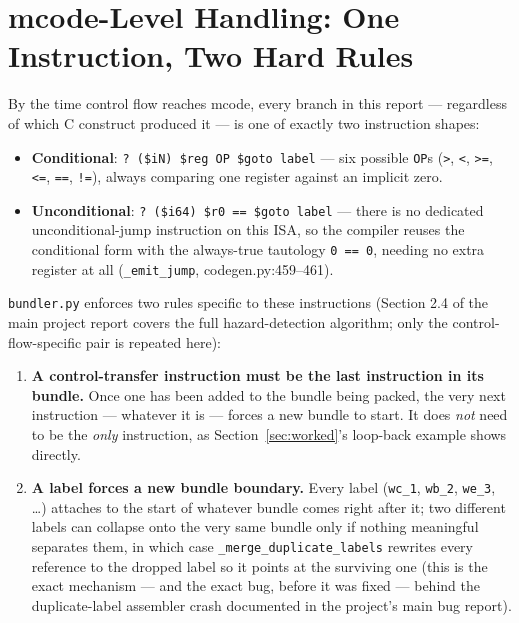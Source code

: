 \documentclass[11pt,a4paper]{article}
\begin{document}
\section{mcode-Level Handling: One Instruction, Two Hard Rules}
\label{sec:mcode}

By the time control flow reaches mcode, every branch in this report --- regardless of
which C construct produced it --- is one of exactly two instruction shapes:
\begin{itemize}
  \item \textbf{Conditional}: \texttt{? (\$iN) \$reg OP \$goto label} --- six possible
        \texttt{OP}s (\texttt{>}, \texttt{<}, \texttt{>=}, \texttt{<=}, \texttt{==}, \texttt{!=}),
        always comparing one register against an implicit zero.
  \item \textbf{Unconditional}: \texttt{? (\$i64) \$r0 == \$goto label} --- there is no
        dedicated unconditional-jump instruction on this ISA, so the compiler reuses the
        conditional form with the always-true tautology \texttt{0 == 0}, needing no extra
        register at all (\texttt{\_emit\_jump}, codegen.py:459--461).
\end{itemize}

\texttt{bundler.py} enforces two rules specific to these instructions (Section
2.4 of the main project report covers the full hazard-detection algorithm; only the
control-flow-specific pair is repeated here):
\begin{enumerate}
  \item \textbf{A control-transfer instruction must be the last instruction in its
        bundle.} Once one has been added to the bundle being packed, the very next
        instruction --- whatever it is --- forces a new bundle to start. It does \emph{not}
        need to be the \emph{only} instruction, as Section~\ref{sec:worked}'s loop-back
        example shows directly.
  \item \textbf{A label forces a new bundle boundary.} Every label (\texttt{wc\_1},
        \texttt{wb\_2}, \texttt{we\_3}, \ldots) attaches to the start of whatever bundle
        comes right after it; two different labels can collapse onto the very same bundle
        only if nothing meaningful separates them, in which case
        \texttt{\_merge\_duplicate\_labels} rewrites every reference to the dropped label
        so it points at the surviving one (this is the exact mechanism --- and the exact
        bug, before it was fixed --- behind the duplicate-label assembler crash documented
        in the project's main bug report).
\end{enumerate}
\end{document}
